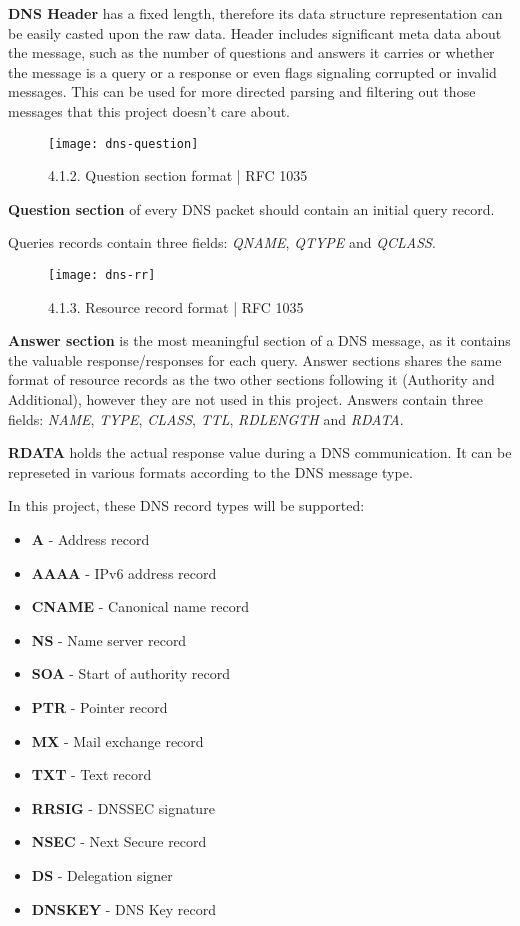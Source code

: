 \textbf{DNS Header} has a fixed length, therefore its data structure representation can be easily casted upon the raw data.
Header includes significant meta data about the message, such as the number of questions and answers it carries 
or whether the message is a query or a response or even flags signaling corrupted or invalid messages.
This can be used for more directed parsing and filtering out those messages that this project doesn't care about.

\vspace{1cm}
\begin{figure}[h]
\texttt{[image: dns-question]}
\centering
\caption{4.1.2. Question section format | RFC 1035}
\end{figure}

\textbf{Question section} of every DNS packet should contain an initial query record. 

Queries records contain three fields: \textit{QNAME}, \textit{QTYPE} and \textit{QCLASS}.

\vspace{1cm}
\begin{figure}[H]
\texttt{[image: dns-rr]}
\centering
\caption{4.1.3. Resource record format | RFC 1035}
\end{figure}

\textbf{Answer section} is the most meaningful section of a DNS message, as it contains the valuable response/responses for each query.
Answer sections shares the same format of resource records as the two other sections following it (Authority and Additional), however they are not used in this project.
Answers contain three fields: \textit{NAME}, \textit{TYPE}, \textit{CLASS}, \textit{TTL}, \textit{RDLENGTH} and \textit{RDATA}.

\textbf{RDATA} holds the actual response value during a DNS communication.
It can be represeted in various formats according to the DNS message type.

In this project, these DNS record types will be supported:
\begin{itemize}
\item \textbf{A} - Address record 
\item \textbf{AAAA} - IPv6 address record
\item \textbf{CNAME} - Canonical name record
\item \textbf{NS} - Name server record
\item \textbf{SOA} - Start of authority record
\item \textbf{PTR} - Pointer record
\item \textbf{MX} - Mail exchange record
\item \textbf{TXT} - Text record
\item \textbf{RRSIG} - DNSSEC signature
\item \textbf{NSEC} - Next Secure record
\item \textbf{DS} - Delegation signer
\item \textbf{DNSKEY} - DNS Key record
\end{itemize}


